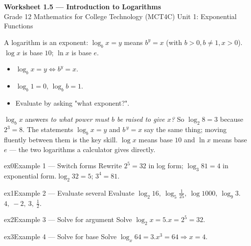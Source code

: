 \documentclass[11pt]{article}
\begin{document}
\begin{center}
{\LARGE\bfseries\color{titleblue}Worksheet 1.5 --- Introduction to Logarithms}\\[2pt]
{\small Grade 12 Mathematics for College Technology (MCT4C) \textperiodcentered{} Unit 1: Exponential Functions}
\end{center}

\begin{ideabox}
A logarithm is an exponent: $\log_b x=y$ means $b^{y}=x$ (with $b>0,b\ne1,x>0$). $\log x$ is base $10$; $\ln x$ is base $e$.
\begin{itemize}[leftmargin=*,itemsep=2pt]
  \item $\log_b x=y\iff b^{y}=x$.
  \item $\log_b 1=0$, $\log_b b=1$.
  \item Evaluate by asking "what exponent?".
\end{itemize}
\end{ideabox}

\begin{learnbox}
$\log_b x$ answers \emph{to what power must $b$ be raised to give $x$?} So $\log_2 8=3$ because $2^3=8$.
The statements $\log_b x=y$ and $b^{\,y}=x$ say the same thing; moving fluently between them is the key skill.
$\log x$ means base $10$ and $\ln x$ means base $e$ — the two logarithms a calculator gives directly.
\end{learnbox}


\begin{example}{ex0}{Example 1 --- Switch forms}
Rewrite $2^5=32$ in log form; $\log_3 81=4$ in exponential form.\soln $\log_2 32=5$; $3^4=81$.
\end{example}

\begin{example}{ex1}{Example 2 --- Evaluate several}
Evaluate $\log_2 16,\ \log_5\tfrac1{25},\ \log 1000,\ \log_9 3$.\soln $4,\ -2,\ 3,\ \tfrac12$.
\end{example}

\begin{example}{ex2}{Example 3 --- Solve for argument}
Solve $\log_2 x=5$.\soln $x=2^5=32$.
\end{example}

\begin{example}{ex3}{Example 4 --- Solve for base}
Solve $\log_x 64=3$.\soln $x^3=64\Rightarrow x=4$.
\end{example}
\end{document}

